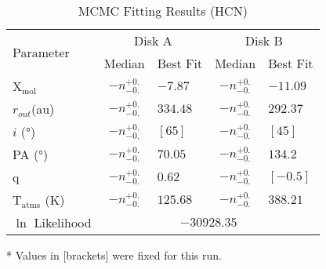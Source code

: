 \begin{table}[h!]
  \centering
  \begin{threeparttable}
    \caption{MCMC Fitting Results (HCN)}
    \label{table:fit_hcn}
    \renewcommand{\arraystretch}{1.2}
    \begin{tabular}{l c l c l }
      \toprule \toprule
      \multirow{2}{*}{Parameter} & \multicolumn{2}{c}{Disk A} & \multicolumn{2}{c}{Disk B} \\
                                 & Median & Best Fit          & Median & Best Fit \\
      \midrule %
      X$_\text{mol}$             & $ -n _{-0.} ^{+0.}$ & $-7.87$    & $ -n _{-0.} ^{+0.}$ & $-11.09$ \\
      $r_{out}$(\si{au})        & $ -n _{-0.} ^{+0.}$ & $334.48$    & $ -n _{-0.} ^{+0.}$  & $292.37$    \\
      $i$ (\si{\degree})        & $ -n _{-0.} ^{+0.}$ & $[65]$   & $ -n _{-0.} ^{+0.}$ & $[45]$    \\
      PA  (\si{\degree})        & $ -n _{-0.} ^{+0.}$ & $70.05$  & $ -n _{-0.} ^{+0.}$  & $134.2$  \\
      q                         & $ -n _{-0.} ^{+0.}$ & $0.62$  & $ -n _{-0.} ^{+0.}$  & $[-0.5]$  \\
      T$_\text{atms}$ (\si{\K}) & $ -n _{-0.} ^{+0.}$ & $125.68 $  & $ -n _{-0.} ^{+0.}$  & $388.21$  \\
      $\ln$ Likelihood          & \multicolumn{4}{c}{$-30928.35$} \\
      \bottomrule
    \end{tabular}
    \begin{tablenotes}\footnotesize
      \item[*] Values in [brackets] were fixed for this run.
    \end{tablenotes}
  \end{threeparttable}
\end{table}






